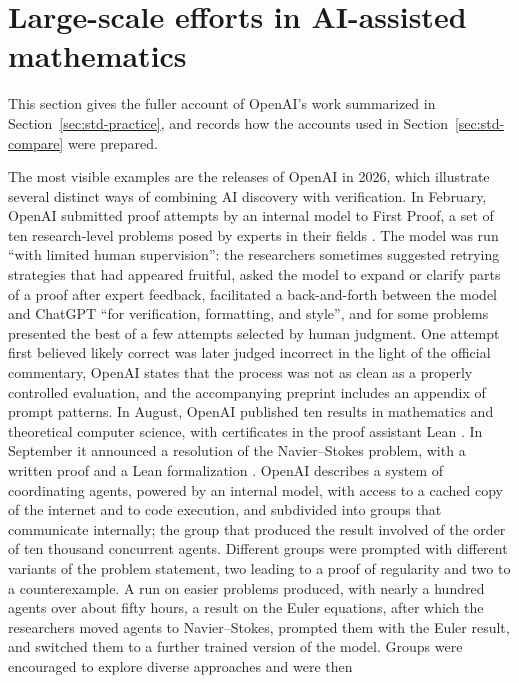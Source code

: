 \section{Large-scale efforts in AI-assisted mathematics}\label{supp:practice}

This section gives the fuller account of OpenAI's work summarized in Section~\ref{sec:std-practice}, and records how
the accounts used in Section~\ref{sec:std-compare} were prepared.

The most visible examples are the releases of OpenAI in 2026, which illustrate several distinct ways of combining
AI discovery with verification. In February, OpenAI submitted proof attempts by an internal model to First Proof,
a set of ten research-level problems posed by experts in their fields \citep{openai_firstproof_2026}. The model
was run ``with limited human supervision'': the researchers sometimes suggested retrying strategies that had
appeared fruitful, asked the model to expand or clarify parts of a proof after expert feedback, facilitated a
back-and-forth between the model and ChatGPT ``for verification, formatting, and style'', and for some problems
presented the best of a few attempts selected by human judgment. One attempt first believed likely correct was
later judged incorrect in the light of the official commentary, OpenAI states that the process was not as clean as a
properly controlled evaluation, and the accompanying preprint includes an appendix of prompt patterns. In
August, OpenAI published ten results in mathematics and theoretical computer science, with certificates in the
proof assistant Lean \citep{openai_tenproofs_2026}. In September it announced a resolution of the Navier--Stokes
problem, with a written proof and a Lean formalization \citep{openai_navierstokes_2026}. OpenAI describes a
system of coordinating agents, powered by an internal model, with access to a cached copy of the internet and to
code execution, and subdivided into groups that communicate internally; the group that produced the result
involved of the order of ten thousand concurrent agents. Different groups were prompted with different variants of
the problem statement, two leading to a proof of regularity and two to a counterexample. A run on easier problems
produced, with nearly a hundred agents over about fifty hours, a result on the Euler equations, after which the
researchers moved agents to Navier--Stokes, prompted them with the Euler result, and switched them to a further
trained version of the model. Groups were encouraged to explore diverse approaches and were then
